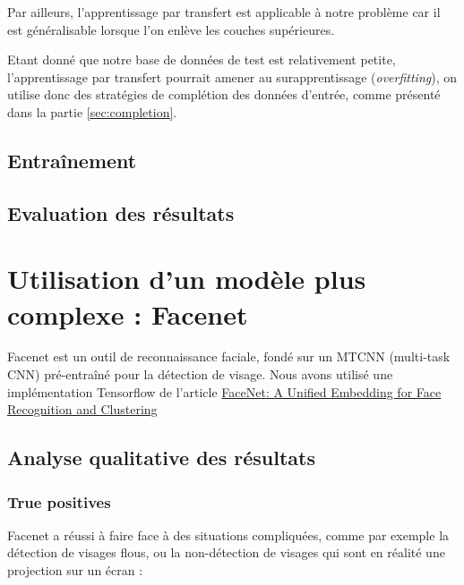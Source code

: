 \documentclass[a4paper,11pt]{article}
\begin{document}
Par ailleurs, l'apprentissage par transfert est applicable à notre problème car il est généralisable
lorsque l'on enlève les couches supérieures.

Etant donné que notre base de données de test est relativement petite, l'apprentissage par transfert pourrait amener au surapprentissage (\textit{overfitting}), on utilise donc des stratégies de complétion des données d'entrée, comme présenté dans la partie \ref{sec:completion}.

    \subsection{Entraînement}
    \subsection{Evaluation des résultats}

\section{Utilisation d'un modèle plus complexe : Facenet}

    Facenet est un outil de reconnaissance faciale, fondé sur un MTCNN (multi-task CNN) pré-entraîné pour la détection de visage. Nous avons utilisé une implémentation Tensorflow de l'article \href{https://arxiv.org/abs/1503.03832}{FaceNet: A Unified Embedding for Face Recognition and Clustering}

    \subsection{Analyse qualitative des résultats}
	\subsubsection{True positives}

	    Facenet a réussi à faire face à des situations compliquées, comme par exemple la détection de visages flous, ou la non-détection de visages qui sont en réalité une projection sur un écran :\\
	    
\end{document}
